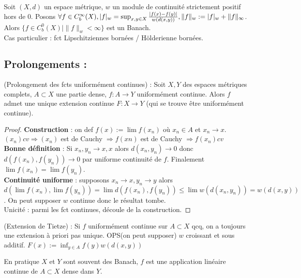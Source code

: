 \begin{ex}
    Soit $(X,d)$ un espace métrique, $w$ un module de continuité strictement positif hors de 0. Posons $\forall f\in C^\infty _b(X),\\ |f|_w=\sup_{x,y\in X}\frac{|f(x)-f(y)|}{w(d(x,y))},\|f\|_w:=|f|_w+\|f\|_\infty $. \\
    Alors $\{f\in C^0_b(X)|\|f\|_w<\infty \} $ est un Banach.\\
    Cas particulier : fct Lipschitziennes bornées / Hölderienne bornées.
\end{ex}

\subsection{Prolongements :}
\begin{propriete}
    (Prolongement des fcts uniformément continues) : Soit $X,Y$ des espaces métriques complets, $A\subset X$ une partie dense, $f:A\to Y$ uniformément continue. Alors $f$ admet une unique extension continue $F:X\to Y$ (qui se trouve être uniformément continue).
\end{propriete}
\begin{proof}
    \textbf{Construction} : on def $f(x):=\lim f(x_n)$ où $x_{n}\in A$ et $x_{n}\to x$. $(x_{n})cv\Rightarrow (x_{n})$ est de Cauchy $\Rightarrow f(xn)$ est de Cauchy $\Rightarrow f(x_{n})cv$ \\
    \textbf{Bonne définition} : Si $x_{n},y_n \to x,x$ alors $d(x_{n},y_n)\to 0$ donc \\$d(f(x_{n}),f(y_n))\to 0$ par uniforme continuité de $f$. Finalement \\$\lim f(x_{n})=\lim f(y_n).$ \\
\textbf{Continuité uniforme} : supposons $x_{n}\to x, y_n\to y$ alors $d(\lim f(x_{n}), \lim f(y_n))=\lim d(f(x_{n}),f(y_n))\le \lim w(d(x_{n},y_n))=w(d(x,y))$. On peut supposer $w$ continue donc le résultat tombe.\\
    Unicité : parmi les fct continues, découle de la construction.
\end{proof}
\begin{remarque}
    (Extension de Tietze) : Si $f$ uniformément continue sur $A\subset X$ qcq, on a toujours une extension à priori pas unique. OPS(on peut supposer) $w$ croissant et sous additif. $F(x):=\inf_{y\in A}f(y)w(d(x,y))$
\end{remarque}
\begin{remarque}
    En pratique $X$ et $Y$ sont souvent des Banach, $f$ est une application linéaire continue de $A\subset X$ dense dans $Y$.
\end{remarque}
